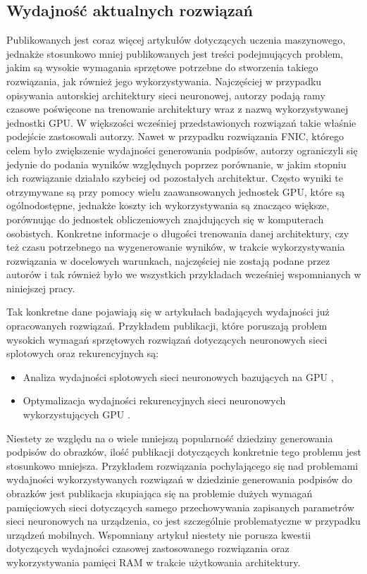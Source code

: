 \subsection{Wydajność aktualnych rozwiązań}
Publikowanych jest coraz więcej artykułów dotyczących uczenia maszynowego, jednakże stosunkowo mniej publikowanych jest treści podejmujących problem, jakim są wysokie wymagania sprzętowe potrzebne do stworzenia takiego rozwiązania, jak również jego wykorzystywania. Najczęściej w przypadku opisywania autorskiej architektury sieci neuronowej, autorzy podają ramy czasowe poświęcone na trenowanie architektury wraz z nazwą wykorzystywanej jednostki GPU. W większości wcześniej przedstawionych rozwiązań takie właśnie podejście zastosowali autorzy. Nawet w przypadku rozwiązania FNIC, którego celem było zwiększenie wydajności generowania podpisów, autorzy ograniczyli się jedynie do podania wyników względnych poprzez porównanie, w jakim stopniu ich rozwiązanie działało szybciej od pozostałych architektur. Często wyniki te otrzymywane są przy pomocy wielu zaawansowanych jednostek GPU, które są ogólnodostępne, jednakże koszty ich wykorzystywania są znacząco większe, porównując do jednostek obliczeniowych znajdujących się w komputerach osobistych. Konkretne informacje o długości trenowania danej architektury, czy też czasu potrzebnego na wygenerowanie wyników, w trakcie wykorzystywania rozwiązania w docelowych warunkach, najczęściej nie zostają podane przez autorów i tak również było we wszystkich przykładach wcześniej wspomnianych w niniejszej pracy.

Tak konkretne dane pojawiają się w artykułach badających wydajności już opracowanych rozwiązań. Przykładem publikacji, które poruszają problem wysokich wymagań sprzętowych rozwiązań dotyczących neuronowych sieci splotowych oraz rekurencyjnych są:
\begin{itemize}
  \item Analiza wydajności splotowych sieci neuronowych bazujących na GPU \cite{cnn-compare},
  \item Optymalizacja wydajności rekurencyjnych sieci neuronowych wykorzystujących GPU \cite{rnn-compare}.
\end{itemize}
Niestety ze względu na o wiele mniejszą popularność dziedziny generowania podpisów do obrazków, ilość publikacji dotyczących konkretnie tego problemu jest stosunkowo mniejsza. Przykładem rozwiązania pochylającego się nad problemami wydajności wykorzystywanych rozwiązań w dziedzinie generowania podpisów do obrazków jest publikacja \cite{wang2023efficient} skupiająca się na problemie dużych wymagań pamięciowych sieci dotyczących samego przechowywania zapisanych parametrów sieci neuronowych na urządzenia, co jest szczególnie problematyczne w przypadku urządzeń mobilnych. Wspomniany artykuł niestety nie porusza kwestii dotyczących wydajności czasowej zastosowanego rozwiązania oraz wykorzystywania pamięci RAM w trakcie użytkowania architektury.

